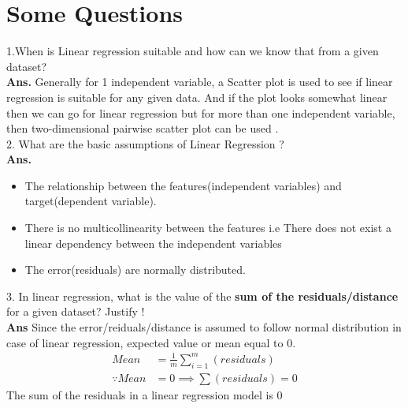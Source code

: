 \documentclass[a4paper, 11pt]{article}
\begin{document}
\section{Some Questions}
1.When is Linear regression suitable and how can we know that from a given dataset?\\
\textbf{Ans.} Generally for 1 independent variable, a Scatter plot is used to see if linear regression is suitable for any given data.
And if the plot looks somewhat linear then we can go for linear regression but for more than one independent variable, then two-dimensional pairwise scatter plot can be used 
.\\ 
2. What are the basic assumptions of Linear Regression ? \\
\textbf{Ans.} \begin{itemize}
    \item The relationship between the features(independent variables) and target(dependent variable).
    \item There is no multicollinearity between the features i.e There does not exist a linear dependency between the independent variables
    \item The error(residuals) are normally distributed.
\end{itemize}
3. In linear regression, what is the value of the \textbf{sum of the residuals/distance} for a given dataset? Justify ! \\
\textbf{Ans} Since the error/reiduals/distance is assumed to follow normal distribution in case of linear regression, expected value or mean equal to 0.
\begin{align}
    Mean &= \frac{1}{m} \sum_{i=1}^m (residuals) \\
    \because Mean &= 0 \implies \sum (residuals) = 0
\end{align}
The sum of the residuals in a linear regression model is 0 \\
\end{document}
